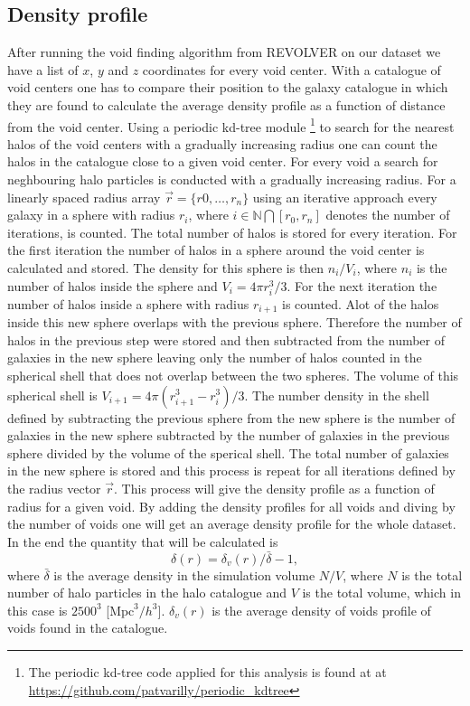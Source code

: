 \subsection{Density profile}\label{sec:voiddensity}
After running the void finding algorithm from REVOLVER on our dataset we have a list of $x$, $y$
and $z$ coordinates for every void center. With a catalogue of void centers one
has to compare their position to the galaxy catalogue in which they are found to
calculate the average density profile as a function of distance from the void
center. Using a periodic kd-tree module \footnote{The periodic kd-tree code
applied for this analysis is found at at \url{https://github.com/patvarilly/periodic_kdtree}} to search for
the nearest halos of the void centers with a gradually increasing radius one can count the halos in
the catalogue close to a given void center. For every void a search for
neghbouring halo particles is conducted with a gradually increasing radius. For
a linearly spaced radius array $\vec{r}=\{r0,\dots,r_{n}\}$ using an iterative
approach every galaxy in a sphere with radius $r_{i}$, where
$i\in\mathbb{N}\bigcap [r_0,r_{n}]$ denotes the
number of iterations, is counted. The total number of halos is stored for
every iteration. For the first iteration the number of halos in a sphere around the void
center is calculated and stored. The density for this sphere is then $n_i/V_i$,
where $n_i$ is the number of halos inside the sphere and $V_i=4\pi r_{i}^3/3$. For
the next iteration the number of halos inside a sphere with radius $r_{i+1}$ is
counted. Alot of the halos inside this new sphere overlaps with the previous
sphere. Therefore the number of halos in the previous step were stored and then
subtracted from the number of galaxies in the new sphere leaving only the number
of halos counted in the spherical shell that does not overlap between the two
spheres. The volume of this spherical shell is $V_{i+1}=4\pi(r_{i+1}^3-r_i^3)/3$. The
number density in the shell defined by subtracting the previous sphere from the
new sphere is the number of galaxies in the new sphere subtracted by the number
of galaxies in the previous sphere divided by the volume of the sperical shell.
The total number of galaxies in the new sphere is stored and this process is
repeat for all iterations defined by the radius vector $\vec{r}$. This process
will give the density profile as a function of radius for a given void. By
adding the density profiles for all voids and diving by the number of voids one
will get an average density profile for the whole dataset. In the end the quantity that will be calculated is 
\begin{equation}
    \delta(r)=\delta_v(r)/\bar{\delta}-1,
\end{equation}
where $\bar{\delta}$ is the average density in the simulation volume $N/V$, where $N$ is the total number of halo particles in the halo catalogue
and $V$ is the total volume, which in this case is $2500^3$ [$\mathrm{Mpc}^3/h^3$]. $\delta_v(r)$ is the average density of voids profile of voids found
in the catalogue. 

